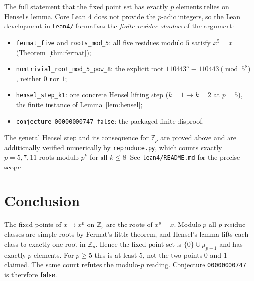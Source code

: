 \documentclass[11pt]{article}
\theoremstyle{definition}
\newcommand{\Zp}{\mathbb{Z}_p}
\begin{document}
The full statement that the fixed point set has exactly $p$ elements relies on
Hensel's lemma. Core Lean 4 does not provide the $p$-adic integers, so the Lean
development in \texttt{lean4/} formalises the \emph{finite residue shadow} of
the argument:
\begin{itemize}
  \item \texttt{fermat\_five} and \texttt{roots\_mod\_5}: all five residues
  modulo $5$ satisfy $x^{5}=x$ (Theorem~\ref{thm:fermat});
  \item \texttt{nontrivial\_root\_mod\_5\_pow\_8}: the explicit root
  $110443^{5}\equiv 110443\pmod{5^{8}}$, neither $0$ nor $1$;
  \item \texttt{hensel\_step\_k1}: one concrete Hensel lifting step
  ($k=1\to k=2$ at $p=5$), the finite instance of Lemma~\ref{lem:hensel};
  \item \texttt{conjecture\_00000000747\_false}: the packaged finite
  disproof.
\end{itemize}
The general Hensel step and its consequence for $\Zp$ are proved above and are
additionally verified numerically by \texttt{reproduce.py}, which counts exactly
$p=5,7,11$ roots modulo $p^{k}$ for all $k\le 8$. See \texttt{lean4/README.md}
for the precise scope.

\section{Conclusion}

The fixed points of $x\mapsto x^{p}$ on $\Zp$ are the roots of $x^{p}-x$.
Modulo $p$ all $p$ residue classes are simple roots by Fermat's little theorem,
and Hensel's lemma lifts each class to exactly one root in $\Zp$. Hence the
fixed point set is $\{0\}\cup\mu_{p-1}$ and has exactly $p$ elements. For
$p\ge 5$ this is at least $5$, not the two points $0$ and $1$ claimed. The same
count refutes the modulo-$p$ reading. Conjecture \texttt{00000000747} is
therefore \textbf{false}.
\end{document}
